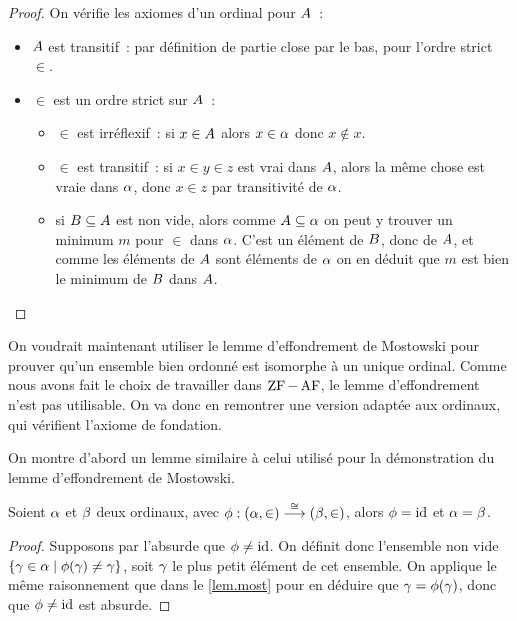 \begin{proof}
  On vérifie les axiomes d'un ordinal pour $A$~:
  \begin{itemize}
  \item $A$ est transitif~: par définition de partie close par le bas, pour
    l'ordre strict $\in$.
  \item $\in$ est un ordre strict sur $A$~:
    \begin{itemize}
    \item $\in$ est irréflexif~: si $x \in A$ alors $x \in \alpha$ donc
      $x\notin x$.
    \item $\in$ est transitif~: si $x\in y \in z$ est vrai dans $A$, alors
      la même chose est vraie dans $\alpha$, donc $x \in z$ par transitivité de
      $\alpha$.
    \item si $B\subseteq A$ est non vide, alors comme
      $A\subseteq \alpha$ on peut y trouver un minimum $m$ pour $\in$ dans
      $\alpha$. C'est un élément de $B$, donc de $A$, et comme les
      éléments de $A$ sont éléments de $\alpha$ on en déduit que $m$ est
      bien le minimum de $B$ dans $A$.\qedhere
    \end{itemize}
  \end{itemize}
\end{proof}

On voudrait maintenant utiliser le lemme d'effondrement de Mostowski pour
prouver qu'un ensemble bien ordonné est isomorphe à un unique ordinal. Comme
nous avons fait le choix de travailler dans $\operatorname{ZF} - \operatorname{AF}$, le lemme
d'effondrement n'est pas utilisable. On va donc en remontrer une version adaptée
aux ordinaux, qui vérifient l'axiome de fondation.

On montre d'abord un lemme similaire à celui utilisé pour la démonstration du
lemme d'effondrement de Mostowski.

\begin{lemma}
  Soient $\alpha$ et $\beta$ deux ordinaux, avec
  $\phi : \displaystyle (\alpha,\in) \overset{\cong}{\longrightarrow} (\beta,\in)$, alors $\phi = \operatorname{id}$
  et $\alpha = \beta$.
\end{lemma}

\begin{proof}
  Supposons par l'absurde que $\phi\neq\operatorname{id}$. On définit donc l'ensemble non
  vide $\left\{ \gamma \in \alpha \;\middle\vert\; \phi(\gamma)\neq\gamma \right\}$, soit $\gamma$
  le plus petit élément de cet ensemble. On applique le même raisonnement que
  dans le \cref{lem.most} pour en déduire que $\gamma = \phi(\gamma)$, donc
  que $\phi\neq\operatorname{id}$ est absurde.
\end{proof}

